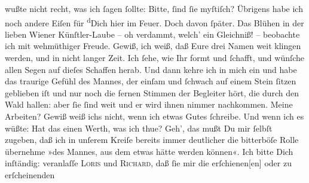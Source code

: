 \begin{ledgroupsized}[t]{13cm}
               wußte nicht recht, was {\pb}ich ſagen ſollte: Bitte,
               ſind ſie myſtiſch?\pend
           \pstart
           Übrigens habe ich noch andere Eiſen für \substVorne{}\textsuperscript{d}\substDazwischen{}D\substHinten{}ich hier im Feuer. Doch davon ſpäter.\pend
           \pstart
           Das Blühen in der lieben Wiener Künſtler-Laube –
               oh verdammt, welch’ ein Gleichniß! – beobachte ich mit wehmüthiger Freude. Gewiß, ich
               weiß, daß Eure drei Namen weit klingen werden, und in nicht langer Zeit. Ich ſehe, wie
                  Ihr formt und ſchafft, und wünſche allen Segen {\pb}auf dieſes Schaffen herab. Und dann kehre ich in
               mich ein und habe das traurige Gefühl des Mannes, der einſam und ſchwach auf einem
               Stein ſitzen geblieben iſt und nur noch die fernen Stimmen der Begleiter hört, die
               durch den Wald hallen: aber ſie ſind weit und er wird ihnen nimmer nachkommen. Meine
               Arbeiten? Gewiß weiß ichs nicht, wenn ich etwas Gutes ſchreibe. Und wenn ich es
               wüßte: Hat das einen Werth, was ich thue? Geh’, das mußt {\pb}Du mir ſelbſt zugeben, daß ich in unſerem Kreiſe
               bereits immer deutlicher die bitterböſe Rolle übernehme »des Mannes, aus dem etwas
               hätte werden können«.\pend
           \pstart
           Ich bitte Dich inſtändig: veranlaſſe \textsc{Loris} und \textsc{Richard}, daß ſie mir die erſchienen{[}en{]} oder zu erſcheinenden
                  \label{K_L02719-7v}
\end{ledgroupsized}

